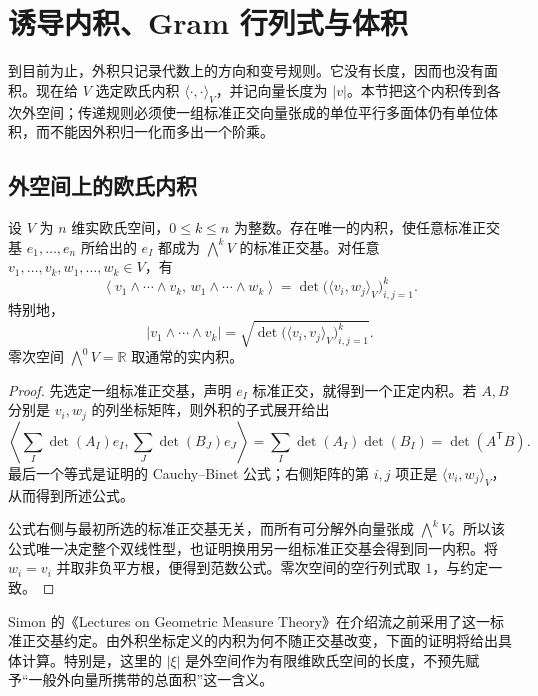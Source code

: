 \section{诱导内积、Gram 行列式与体积}
\label{b1:sec:B103}

到目前为止，外积只记录代数上的方向和变号规则。它没有长度，因而也没有面积。现在给 \(V\) 选定欧氏内积 \(\langle\cdot,\cdot\rangle_V\)，并记向量长度为 \(|v|\)。本节把这个内积传到各次外空间；传递规则必须使一组标准正交向量张成的单位平行多面体仍有单位体积，而不能因外积归一化而多出一个阶乘。

\subsection{外空间上的欧氏内积}
\label{b1:subsec:B10301}

\begin{theorem}[外空间的诱导内积]\label{b1:thm:app-b-gram-inner-product}
设 \(V\) 为 \(n\) 维实欧氏空间，\(0\le k\le n\) 为整数。存在唯一的内积，使任意标准正交基 \(e_1,\ldots,e_n\) 所给出的 \(e_I\) 都成为 \(\bigwedge^kV\) 的标准正交基。对任意 \(v_1,\ldots,v_k,w_1,\ldots,w_k\in V\)，有
\begin{equation}\label{b1:eq:app-b-exterior-inner-product}
 \left\langle
    v_1\wedge\cdots\wedge v_k,\,
    w_1\wedge\cdots\wedge w_k
 \right\rangle
  =\det\bigl(\langle v_i,w_j\rangle_V\bigr)_{i,j=1}^k.
\end{equation}
特别地，
\[
 |v_1\wedge\cdots\wedge v_k|
  =\sqrt{\det\bigl(\langle v_i,v_j\rangle_V\bigr)_{i,j=1}^k}.
\]
零次空间 \(\bigwedge^0V=\mathbb R\) 取通常的实内积。
\end{theorem}
\begin{proof}
先选定一组标准正交基，声明 \(e_I\) 标准正交，就得到一个正定内积。若 \(A,B\) 分别是 \(v_i,w_j\) 的列坐标矩阵，则外积的子式展开给出
\[
 \left\langle\sum_I\det(A_I)e_I,\sum_J\det(B_J)e_J\right\rangle
   =\sum_I\det(A_I)\det(B_I)
   =\det(A^{\mathsf T}B).
\]
最后一个等式是证明的 Cauchy--Binet 公式；右侧矩阵的第 \(i,j\) 项正是 \(\langle v_i,w_j\rangle_V\)，从而得到所述公式。

公式右侧与最初所选的标准正交基无关，而所有可分解外向量张成 \(\bigwedge^kV\)。所以该公式唯一决定整个双线性型，也证明换用另一组标准正交基会得到同一内积。将 \(w_i=v_i\) 并取非负平方根，便得到范数公式。零次空间的空行列式取 \(1\)，与约定一致。
\end{proof}

Simon 的《Lectures on Geometric Measure Theory》\cite[\S25, pp. 129--131]{Simon1983Lectures}在介绍流之前采用了这一标准正交基约定。由外积坐标定义的内积为何不随正交基改变，下面的证明将给出具体计算。特别是，这里的 \(|\xi|\) 是外空间作为有限维欧氏空间的长度，不预先赋予“一般外向量所携带的总面积”这一含义。

